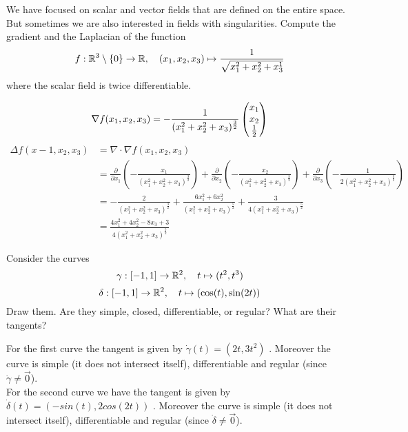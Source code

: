 \documentclass[11pt]{article}
\begin{document}

\begin{exercise}
    We have focused on scalar and vector fields that are defined on the entire space. 
    But sometimes we are also interested in fields with singularities. 
    Compute the gradient and the Laplacian of the function 
    \[
        f : \mathbb{R}^3 \setminus \{0\} \rightarrow \mathbb{R}, \quad (x_1,x_2,x_3) \mapsto \frac{1}{\sqrt{x_1^2+x_2^2+x_3^1}}
    \]
    where the scalar field is twice differentiable. 
\end{exercise}
\begin{solution}   
	$$\nabla f(x_1,x_2,x_3) =-\frac{1}{(x_1^2+x_2^2+x_3)^{\frac{3}{2}}} \begin{pmatrix}x_1\\ x_2\\\frac{1}{2}\end{pmatrix}$$ 
\begin{align*}\Delta f(x-1,x_2,x_3) &= \nabla \cdot \nabla f(x_1,x_2,x_3) \\
								&= \frac{\partial}{\partial x_1}\left(-\frac{x_1}{(x_1^2+x_2^2+x_3)^{\frac{3}{2}}} \right) + \frac{\partial}{\partial x_2}\left(-\frac{x_2}{(x_1^2+x_2^2+x_3)^{\frac{3}{2}}}\right) + \frac{\partial}{\partial x_3}\left(-\frac{1}{2(x_1^2+x_2^2+x_3)^{\frac{3}{2}}} \right)\\
&= -\frac{2}{(x_1^2+x_2^2+x_3)^{\frac{3}{2}}} + \frac{6x_1^2 + 6x_2^2}{(x_1^2+x_2^2+x_3)^{\frac{5}{2}}} + \frac{3}{4(x_1^2+x_2^2+x_3)^{\frac{5}{2}}}\\
&=\frac{4x_1^2 + 4x_2^2 -8x_3 +3}{4(x_1^2+x_2^2+x_3)^{\frac{5}{2}}}
\end{align*}
\end{solution}

\begin{exercise}
    Consider the curves 
    \[
        \gamma : [-1,1] \rightarrow \mathbb{R}^2, \quad t \mapsto ( t^2, t^3 )
    \]
    \[
        \delta : [-1,1] \rightarrow \mathbb{R}^2, \quad t \mapsto ( \cos(t), \sin(2t) )
    \]
    Draw them. Are they simple, closed, differentiable, or regular? What are their tangents?
\end{exercise}
\begin{solution}    
 For the first curve the tangent is given by $\dot{\gamma}(t) = (2t, 3t^2)$ . Moreover the curve is simple (it does not intersect itself), differentiable and regular (since $\dot{\gamma} \neq \vec{0}$).\\

For the second curve we have the tangent is given by $\dot{\delta}(t) = (-sin(t),2cos(2t))$ . Moreover the curve is simple (it does not intersect itself), differentiable and regular (since $\dot{\delta} \neq \vec{0}$).\\
\end{solution}
\end{document}
